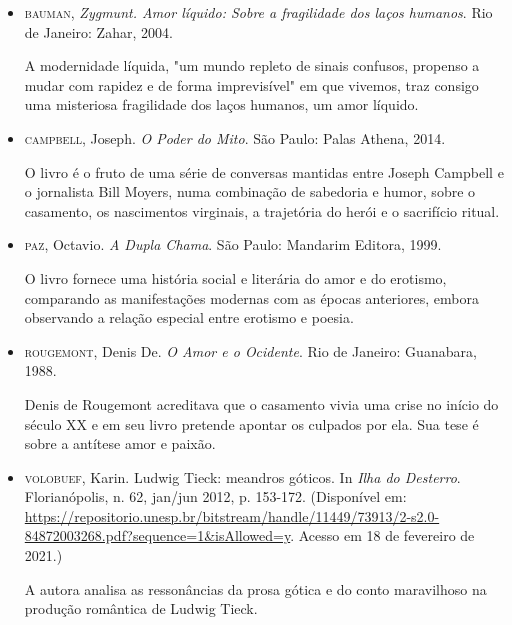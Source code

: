 \documentclass[11pt]{extarticle}
\begin{document}
\begin{itemize}
\item\textsc{bauman,} \textit{Zygmunt. Amor líquido: Sobre a fragilidade dos
laços humanos}. Rio de Janeiro: Zahar, 2004.

A modernidade líquida, "um mundo repleto de sinais confusos, propenso a
mudar com rapidez e de forma imprevisível" em que vivemos, traz consigo
uma misteriosa fragilidade dos laços humanos, um amor líquido.

\item\textsc{campbell}, Joseph. \textit{O Poder do Mito}. São Paulo: Palas Athena,
2014.

O livro é o fruto de uma série de conversas mantidas entre Joseph
Campbell e o jornalista Bill Moyers, numa combinação de sabedoria e
humor, sobre o casamento, os nascimentos virginais, a trajetória do
herói e o sacrifício ritual.

\item\textsc{paz}, Octavio. \textit{A Dupla Chama}. São Paulo: Mandarim Editora, 1999.

O livro fornece uma história social e literária do amor e do erotismo,
comparando as manifestações modernas com as épocas anteriores, embora
observando a relação especial entre erotismo e poesia.

\item\textsc{rougemont}, Denis De. \textit{O Amor e o Ocidente}. Rio de Janeiro:
Guanabara, 1988.

Denis de Rougemont acreditava que o casamento vivia uma crise no início
do século XX e em seu livro pretende apontar os culpados por ela. Sua
tese é sobre a antítese amor e paixão.

\item\textsc{volobuef}, Karin. Ludwig Tieck: meandros góticos. In \emph{Ilha
do Desterro}. Florianópolis, n. 62, jan/jun 2012, p. 153-172.
(Disponível em:
\url{https://repositorio.unesp.br/bitstream/handle/11449/73913/2-s2.0-84872003268.pdf?sequence=1\&isAllowed=y}.
Acesso em 18 de fevereiro de 2021.)

A autora analisa as ressonâncias da prosa gótica e do conto maravilhoso
na produção romântica de Ludwig Tieck.
\end{itemize}
\end{document}
